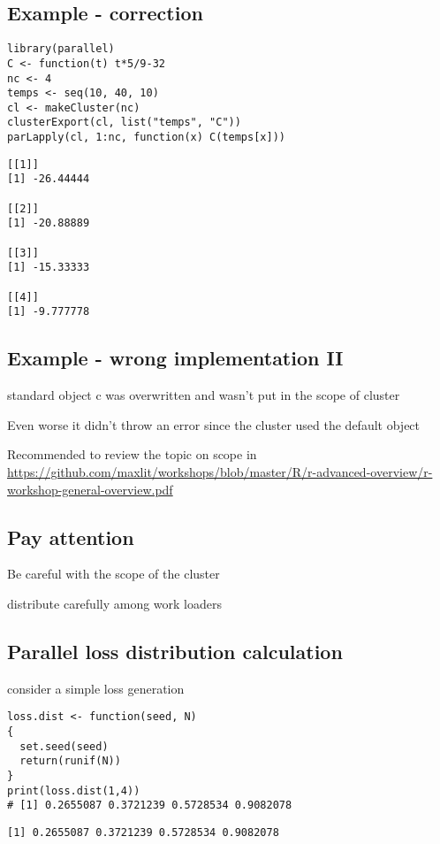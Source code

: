 \documentclass[bigger]{beamer}
\begin{document}
\subsection{Example - correction}
\label{sec-3-10}
\begin{verbatim}
library(parallel)
C <- function(t) t*5/9-32
nc <- 4
temps <- seq(10, 40, 10)
cl <- makeCluster(nc)
clusterExport(cl, list("temps", "C"))
parLapply(cl, 1:nc, function(x) C(temps[x]))
\end{verbatim}

\begin{verbatim}
[[1]]
[1] -26.44444

[[2]]
[1] -20.88889

[[3]]
[1] -15.33333

[[4]]
[1] -9.777778
\end{verbatim}

\subsection{Example - wrong implementation II}
\label{sec-3-11}
\begin{frame}[label=sec-3-11-1]{standard object \alert{c} was overwritten and wasn't put in the scope of cluster}
\end{frame}
\begin{frame}[label=sec-3-11-2]{Even worse it didn't throw an error since the cluster used the default object}
\end{frame}
\begin{frame}[label=sec-3-11-3]{Recommended to review the topic on scope in}
\url{https://github.com/maxlit/workshops/blob/master/R/r-advanced-overview/r-workshop-general-overview.pdf}
\end{frame}
\subsection{Pay attention}
\label{sec-3-12}
\begin{frame}[label=sec-3-12-1]{Be careful with the scope of the cluster}
\end{frame}
\begin{frame}[label=sec-3-12-2]{distribute carefully among work loaders}
\end{frame}
\subsection{Parallel loss distribution calculation}
\label{sec-3-13}
\begin{frame}[fragile,label=sec-3-13-1]{consider a simple loss generation}
 \begin{verbatim}
loss.dist <- function(seed, N)
{
  set.seed(seed)
  return(runif(N))
}
print(loss.dist(1,4))
# [1] 0.2655087 0.3721239 0.5728534 0.9082078
\end{verbatim}

\begin{verbatim}
[1] 0.2655087 0.3721239 0.5728534 0.9082078
\end{verbatim}
\end{frame}
\end{document}

